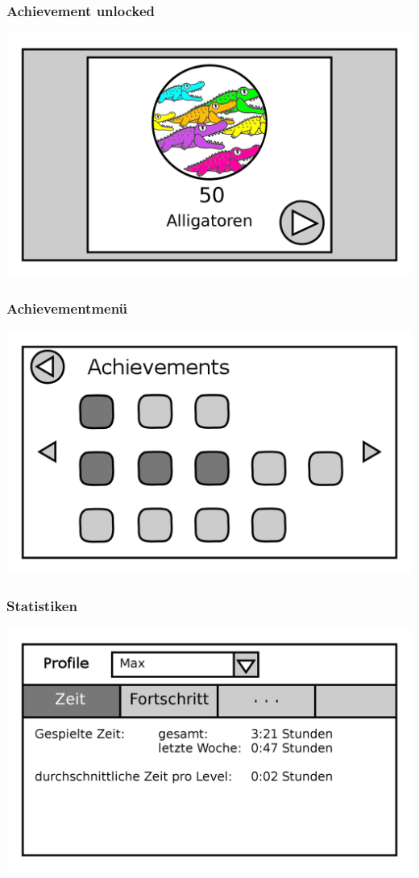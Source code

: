 \documentclass[t]{beamer}
\begin{document}
\begin{frame}
	\frametitle{Achievement unlocked}
	\includegraphics[width=\textwidth]{achievement_aligator.png}
\end{frame}
\begin{frame}
	\frametitle{Achievementmenü}
	\includegraphics[width=\textwidth]{achievements.png}
\end{frame}
\begin{frame}
	\frametitle{Statistiken}
	\includegraphics[width=\textwidth]{stats_mod.png}
\end{frame}
\end{document}
